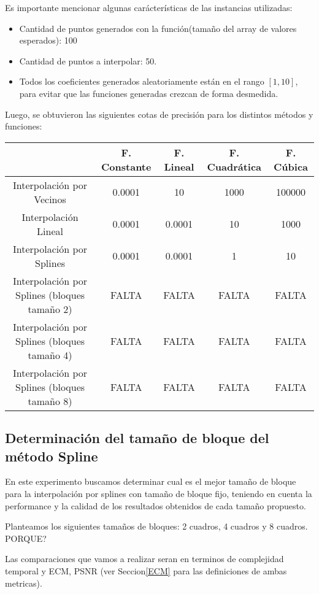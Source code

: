 Es importante mencionar algunas carácterísticas de las instancias utilizadas:
\begin{itemize}
    \item Cantidad de puntos generados con la función(tamaño del array de valores esperados): 100
    \item Cantidad de puntos a interpolar: 50.
    \item Todos los coeficientes generados aleatoriamente están en el rango $[1,10]$,
        para evitar que las funciones generadas crezcan de forma desmedida.
\end{itemize}

Luego, se obtuvieron las siguientes cotas de precisión para los distintos métodos y funciones:

\begin{table}[H]
    \begin{tabular}{| c | c | c | c | c |}
    \hline
    {} & F. Constante & F. Lineal & F. Cuadrática & F. Cúbica \\ \hline
    Interpolación por Vecinos & 0.0001 & 10 & 1000 & 100000 \\
    Interpolación Lineal & 0.0001 & 0.0001 & 10 & 1000 \\
    Interpolación por Splines & 0.0001 & 0.0001 & 1 & 10 \\
    Interpolación por Splines (bloques tamaño 2) & FALTA & FALTA & FALTA & FALTA \\
    Interpolación por Splines (bloques tamaño 4) & FALTA & FALTA & FALTA & FALTA \\
    Interpolación por Splines (bloques tamaño 8) & FALTA & FALTA & FALTA & FALTA \\
    \hline
    \end{tabular}
\end{table}

\subsection{Determinación del tamaño de bloque del método Spline}
En este experimento buscamos determinar cual es el mejor tamaño de bloque para la interpolación por splines con tamaño de bloque fijo, teniendo en cuenta la performance y la calidad de los resultados obtenidos de cada tamaño propuesto.

Planteamos los siguientes tamaños de bloques: 2 cuadros, 4 cuadros y 8 cuadros. PORQUE?

Las comparaciones que vamos a realizar seran en terminos de complejidad temporal y ECM, PSNR (ver Seccion\ref{ECM} para las definiciones de ambas metricas).
